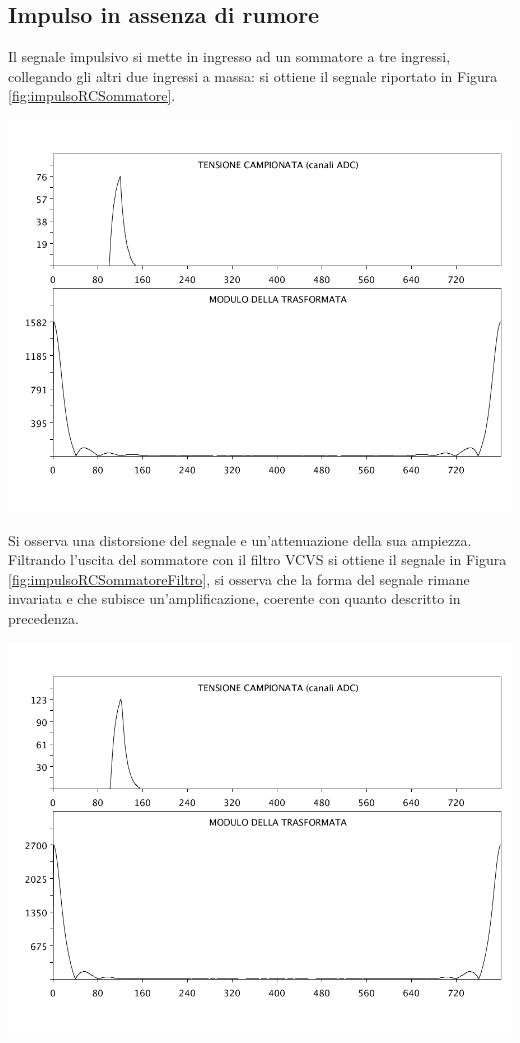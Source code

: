 \documentclass[10pt,oneside,a4paper]{article}
\newenvironment{Figure}
  {\par\medskip\noindent\minipage{\linewidth}}
  {\endminipage\par\medskip}
\begin{document}
\begin{multicols}{2}
\subsection{Impulso in assenza di rumore}
Il segnale impulsivo si mette in ingresso ad un sommatore a tre ingressi, collegando gli altri due ingressi a massa: si ottiene il segnale riportato in Figura \ref{fig:impulsoRCSommatore}.
\begin{Figure}
	\begin{center}
	\includegraphics[width=\linewidth]{impulsoRCSommatore}
	\label{fig:impulsoRCSommatore}
	\end{center}
\end{Figure}
Si osserva una distorsione del segnale e un'attenuazione della sua ampiezza. Filtrando l'uscita del sommatore con il filtro VCVS si ottiene il segnale in Figura \ref{fig:impulsoRCSommatoreFiltro}, si osserva che la forma del segnale rimane invariata e che subisce un'amplificazione, coerente con quanto descritto in precedenza.
\begin{Figure}
	\begin{center}
	\includegraphics[width=\linewidth]{impulsoRCSommatoreFiltro.png}

\end{center}
\end{Figure}
\end{multicols}
\end{document}
